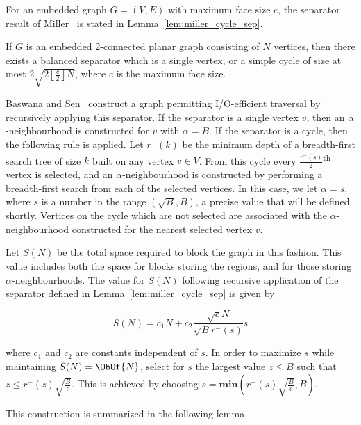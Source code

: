 {For an embedded graph $G=(V,E)$ with maximum face size $c$,
the separator result of Miller~\cite{miller_1986} is 
stated in Lemma~\ref{lem:miller_cycle_sep}.

\begin{lemma}\label{lem:miller_cycle_sep}
If $G$ is an embedded 2-connected planar graph consisting of $N$ vertices, then
there exists a balanced separator which is a single vertex, or a simple cycle
of size at most $2 \sqrt{2 \left\lfloor \frac{c}{2} \right\rfloor N}$,
where $c$ is the maximum face size.
\end{lemma}

Baswana and Sen~\cite{DBLP:journals/algorithmica/BaswanaS02}
construct a graph permitting {I/O}-efficient traversal by recursively
applying this separator.
If the separator is a single vertex $v$, then an $\alpha$-neighbourhood
is constructed for $v$ with $\alpha = B$. 
If the separator is a cycle, then the following rule is applied.
Let $r^{-}(k)$ be the minimum depth of a
breadth-first search tree of size $k$ built on any vertex $v \in
V$.
From this cycle every $\frac{r^{-}(s)}{2}$\textsuperscript{th}
vertex is selected, and an $\alpha$-neighbourhood is constructed 
by performing a breadth-first search from each of the selected 
vertices.
In this case, we let $\alpha=s$, where $s$ is
a number in the range $(\sqrt{B},B)$, a precise value that will be
defined shortly.
Vertices on the cycle which are not selected are associated with the
$\alpha$-neighbourhood constructed for the nearest selected vertex $v$.

Let $S(N)$ be the total space required to block 
the graph in this fashion.
This value includes both the space for blocks storing the
regions, and for those storing $\alpha$-neighbourhoods.
The value for $S(N)$ following recursive application of the 
separator defined in Lemma~\ref{lem:miller_cycle_sep} is
given by

\begin{equation}
  S(N) = c_1N + c_2\frac{\sqrt{c}N}{\sqrt{B}r^{-}(s)} s
\end{equation}

where $c_1$ and $c_2$ are constants independent of $s$.
In order to maximize $s$ while maintaining $S(N) = \OhOf{N}$,
select for $s$ the largest value $z \le B$ such that 
$z \le r^{-}(z)\sqrt{\frac{B}{c}}$.
This is achieved by choosing 
$s = \textbf{min}\left(r^{-}(s)\sqrt{\frac{B}{c}}, B \right)$.

This construction is summarized in the following lemma.

}
